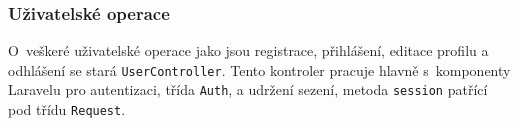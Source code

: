 \subsubsection{Uživatelské operace}
O~veškeré uživatelské operace jako jsou registrace, přihlášení, editace profilu a odhlášení se stará \verb|UserController|. Tento kontroler pracuje hlavně s~komponenty Laravelu pro autentizaci, třída \verb|Auth|, a udržení sezení, metoda \verb|session| patřící pod třídu \verb|Request|.

